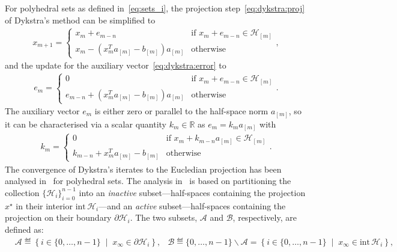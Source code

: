\documentclass[onecolumn]{autart}
\newcommand{\set}[2]{\left\{ #1 \;\middle|\; #2 \right\}}
\begin{document}
For polyhedral sets as defined in~\eqref{eq:sets_i}, the projection step~\eqref{eq:dykstra:proj} of Dykstra's method can be simplified to
\begin{align}\label{eq:dykstra:proj:poly}
x_{m+1}=
\begin{cases}
x_{m}+e_{m-n} & \text{if } x_{m}+e_{m-n}\in\mathcal{H}_{[m]}\\
x_{m} - \left(x_{m}^T a_{[m]} - b_{[m]}\right) a_{[m]} & \text{otherwise}
\end{cases},
\end{align}
and the update for the auxiliary vector~\eqref{eq:dykstra:error} to
\begin{align}\label{eq:dykstra:error:poly}
e_m=
\begin{cases}
0 & \text{if } x_{m}+e_{m-n}\in\mathcal{H}_{[m]}\\
e_{m-n}+\left(x_{m}^T a_{[m]} - b_{[m]}\right) a_{[m]} & \text{otherwise}
\end{cases}.
\end{align}
The auxiliary vector $e_m$ is either zero or parallel to the half-space norm $a_{[m]}$, so it can be characterised via a scalar quantity $k_m \in \mathbb{R}$ as $e_m = k_m a_{[m]}$ with 
\begin{align}\label{eq:km}
k_m = 
\begin{cases}
0 & \text{if } x_{m}+k_{m-n}a_{[m]}\in\mathcal{H}_{[m]}\\
k_{m-n} + x_m^T a_{[m]} - b_{[m]} & \text{otherwise}
\end{cases}.
\end{align}
The convergence of Dykstra's iterates to the Eucledian projection has been analysed in~\cite{DYKSTRAPERKINS,DYKSTRAPOLY,DYKSTRAPOLY2} for polyhedral sets. The analysis in~\cite{DYKSTRAPOLY} is based on partitioning the collection $\{\mathcal{H}_i\}_{i=0}^{n-1}$ into an \emph{inactive} subset---half-spaces containing the projection $x^\star$ in their interior $\text{int}\,\mathcal{H}_i$---and an \emph{active} subset---half-spaces containing the projection on their boundary $\partial\mathcal{H}_i$. The two subsets, $\mathcal{A}$ and $\mathcal{B}$, respectively, are defined as:
\begin{align}
&\mathcal{A} \eqdef \set{i\in\lbrace 0,\dots,n-1\rbrace}{x_\infty\in \partial\mathcal{H}_i},
&\mathcal{B}\eqdef \lbrace 0,\dots,n-1\rbrace\backslash \mathcal{A}=\set{i\in\lbrace 0,\dots,n-1\rbrace}{x_\infty\in \text{int}\,\mathcal{H}_i},
\end{align}
\end{document}
